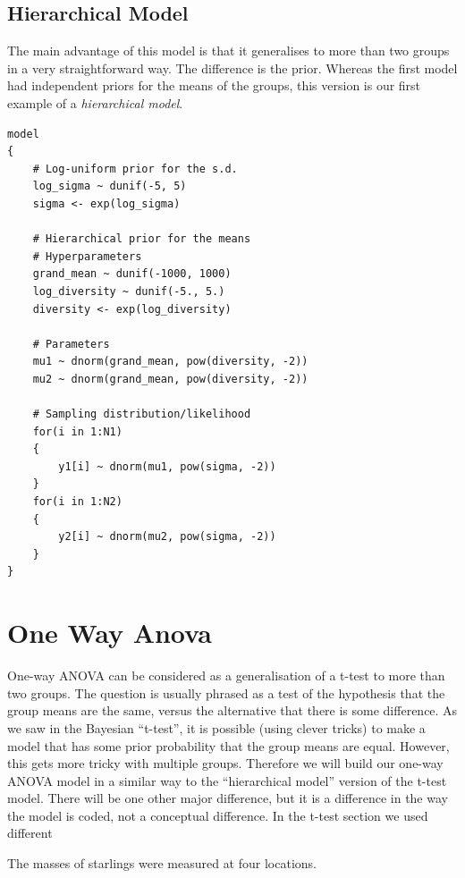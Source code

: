 \subsection{Hierarchical Model}
The main advantage of this model is that it generalises to more than two groups
in a very straightforward way. The difference is the prior. Whereas the first
model had independent priors for the means of the groups, this version is our
first example of a {\it hierarchical model}.
\begin{framed}
\begin{verbatim}
model
{
    # Log-uniform prior for the s.d.
    log_sigma ~ dunif(-5, 5)
    sigma <- exp(log_sigma)

    # Hierarchical prior for the means
    # Hyperparameters
    grand_mean ~ dunif(-1000, 1000)
    log_diversity ~ dunif(-5., 5.)
    diversity <- exp(log_diversity)

    # Parameters
    mu1 ~ dnorm(grand_mean, pow(diversity, -2))
    mu2 ~ dnorm(grand_mean, pow(diversity, -2))

    # Sampling distribution/likelihood
    for(i in 1:N1)
    {
        y1[i] ~ dnorm(mu1, pow(sigma, -2))
    }
    for(i in 1:N2)
    {
        y2[i] ~ dnorm(mu2, pow(sigma, -2))
    }
}

\end{verbatim}
\end{framed}



\section{One Way Anova}
One-way ANOVA can be considered as a generalisation of a t-test to more than
two groups. The question is usually phrased as a test of the hypothesis that
the group means are the same, versus the alternative that there is some difference.
As we saw in the Bayesian ``t-test'', it is possible (using clever tricks) to
make a model that has some prior probability that the group means are equal.
However, this gets more tricky with multiple groups. Therefore we will build our
one-way ANOVA model in a similar way to the ``hierarchical model'' version of the
t-test model. There will be one other major difference, but it is a difference
in the way the model is coded, not a conceptual difference. In the t-test
section we used different 

The masses of starlings were measured at four locations.

